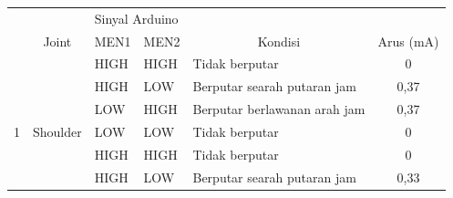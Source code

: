 \begin{table}[H]
		\begin{tabular}{|c|c|l|l|l|c|}
			\hline
			\rowcolor[HTML]{9B9B9B} 
			\cellcolor[HTML]{9B9B9B}                     & \cellcolor[HTML]{9B9B9B}                        & \multicolumn{2}{l|}{\cellcolor[HTML]{9B9B9B}Sinyal Arduino} & \multicolumn{1}{c|}{\cellcolor[HTML]{9B9B9B}}                          & \cellcolor[HTML]{9B9B9B}                            \\ \cline{3-4}
			\rowcolor[HTML]{9B9B9B} 
			\multirow{-2}{*}{\cellcolor[HTML]{9B9B9B}No} & \multirow{-2}{*}{\cellcolor[HTML]{9B9B9B}Joint} & MEN1                         & MEN2                         & \multicolumn{1}{c|}{\multirow{-2}{*}{\cellcolor[HTML]{9B9B9B}Kondisi}} & \multirow{-2}{*}{\cellcolor[HTML]{9B9B9B}Arus (mA)} \\ \hline
			&                                                 & HIGH                         & HIGH                         & Tidak berputar                                                         & 0                                                   \\ \cline{3-6} 
			&                                                 & HIGH                         & LOW                          & Berputar searah putaran jam                                            & 0,37                                                \\ \cline{3-6} 
			&                                                 & LOW                          & HIGH                         & Berputar berlawanan arah jam                                           & 0,37                                                \\ \cline{3-6} 
			\multirow{-4}{*}{1}                          & \multirow{-4}{*}{Shoulder}                      & LOW                          & LOW                          & Tidak berputar                                                         & 0                                                   \\ \hline
			&                                                 & HIGH                         & HIGH                         & Tidak berputar                                                         & 0                                                   \\ \cline{3-6} 
			&                                                 & HIGH                         & LOW                          & Berputar searah putaran jam                                            & 0,33                                                \\ \cline{3-6} 

\end{tabular}
\end{table}
